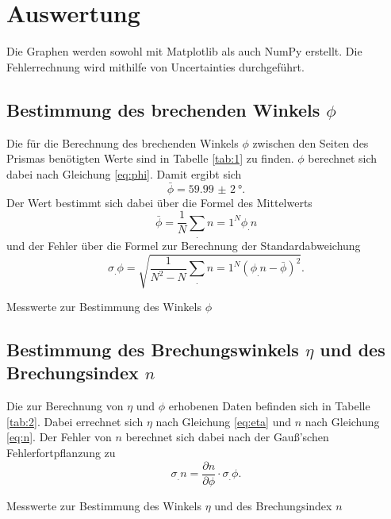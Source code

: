 \section{Auswertung}
\label{sec:Auswertung}


Die Graphen werden sowohl mit Matplotlib \cite{matplotlib} als auch NumPy \cite{numpy} erstellt. Die Fehlerrechnung wird mithilfe von Uncertainties \cite{uncertainties} durchgeführt.
\subsection{Bestimmung des brechenden Winkels $\phi$}

Die für die Berechnung des brechenden Winkels $\phi$ zwischen den Seiten des Prismas benötigten Werte sind in Tabelle \ref{tab:1} zu finden.
$\phi$ berechnet sich dabei nach Gleichung \eqref{eq:phi}.
Damit ergibt sich
\[
\bar{\phi} = \SI{59,99(2)}{\degree}\text{.}
\]
Der Wert bestimmt sich dabei über die Formel des Mittelwerts
\[
\bar{\phi} = \frac{1}{N}\sum_.{n=1}^N \phi_.n
\]
und der Fehler über die Formel zur Berechnung der Standardabweichung
\[
\sigma_.{\phi}=\sqrt{\frac{1}{N^2-N}\sum_.{n=1}^N \left(\phi_.n-\bar{\phi}\right)^2}\text{.}
\]
\begin{table}
	\centering
	\caption{Messwerte zur Bestimmung des Winkels $\phi$}
	
	\label{tab:1}
\end{table}

\subsection{Bestimmung des Brechungswinkels $\eta$ und des Brechungsindex $n$}
Die zur Berechnung von $\eta$ und $\phi$ erhobenen Daten befinden sich in Tabelle \ref{tab:2}.
Dabei errechnet sich $\eta$ nach Gleichung \eqref{eq:eta} und $n$ nach Gleichung \eqref{eq:n}.
Der Fehler von $n$ berechnet sich dabei nach der Gauß'schen Fehlerfortpflanzung zu
\[
\sigma_.n=\frac{\partial n}{\partial \phi}\cdot \sigma_.{\phi}\text{.}
\]
\begin{table}
	\centering
	\caption{Messwerte zur Bestimmung des Winkels $\eta$ und des Brechungsindex $n$}
	
	\label{tab:2}
\end{table}


